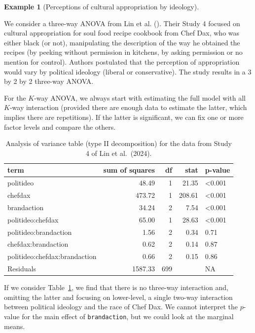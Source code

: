 \documentclass[
  11pt,
  letterpaper,
]{scrbook}
\theoremstyle{definition}
\theoremstyle{definition}
\newtheorem{example}{Example}[chapter]
\theoremstyle{plain}
\theoremstyle{plain}
\theoremstyle{remark}
\begin{document}
\begin{example}[Perceptions of cultural appropriation by
ideology]\protect\hypertarget{exm-LKUK24}{}\label{exm-LKUK24}

We consider a three-way ANOVA from Lin et al.
(). Their Study 4 focused
on cultural appropriation for soul food recipe cookbook from Chef Dax,
who was either black (or not), manipulating the description of the way
he obtained the recipes (by peeking without permission in kitchens, by
asking permission or no mention for control). Authors postulated that
the perception of appropriation would vary by political ideology
(liberal or conservative). The study results in a 3 by 2 by 2 three-way
ANOVA.

For the \(K\)-way ANOVA, we always start with estimating the full model
with all \(K\)-way interaction (provided there are enough data to
estimate the latter, which implies there are repetitions). If the latter
is significant, we can fix one or more factor levels and compare the
others.

\begin{longtable}[]{@{}lrrrl@{}}

\caption{\label{tbl-anova-LKUK24}Analysis of variance table (type II
decomposition) for the data from Study 4 of Lin et al.~(2024).}

\tabularnewline

\toprule\noalign{}
term & sum of squares & df & stat & p-value \\
\midrule\noalign{}
\endhead
\bottomrule\noalign{}
\endlastfoot
politideo & 48.49 & 1 & 21.35 & \textless0.001 \\
chefdax & 473.72 & 1 & 208.61 & \textless0.001 \\
brandaction & 34.24 & 2 & 7.54 & \textless0.001 \\
politideo:chefdax & 65.00 & 1 & 28.63 & \textless0.001 \\
politideo:brandaction & 1.56 & 2 & 0.34 & 0.71 \\
chefdax:brandaction & 0.62 & 2 & 0.14 & 0.87 \\
politideo:chefdax:brandaction & 0.66 & 2 & 0.15 & 0.86 \\
Residuals & 1587.33 & 699 & & NA \\

\end{longtable}

If we consider Table~\ref{tbl-anova-LKUK24}, we find that there is no
three-way interaction and, omitting the latter and focusing on
lower-level, a single two-way interaction between political ideology and
the race of Chef Dax. We cannot interpret the \(p\)-value for the main
effect of \texttt{brandaction}, but we could look at the marginal means.


\end{example}
\end{document}
